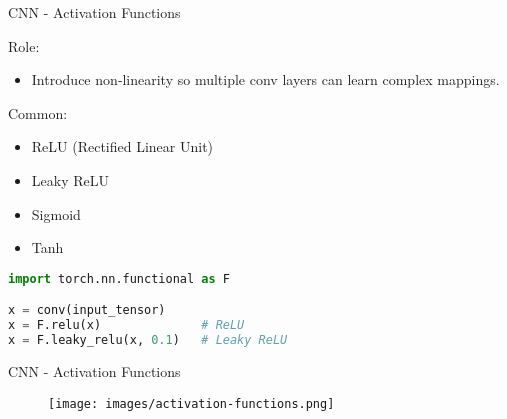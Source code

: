 \begin{frame}[fragile]{CNN - Activation Functions}
\begin{block}{Role:}
    \begin{itemize}
        \item Introduce non‑linearity so multiple conv layers can learn complex mappings.
    \end{itemize}
\end{block}

\begin{block}{Common:}
    \begin{itemize}
        \item ReLU (Rectified Linear Unit)
        \item Leaky ReLU
        \item Sigmoid
        \item Tanh
    \end{itemize}
\end{block}

\begin{lstlisting}[language=Python, caption={Code snippet (PyTorch)}]
import torch.nn.functional as F

x = conv(input_tensor)
x = F.relu(x)              # ReLU
x = F.leaky_relu(x, 0.1)   # Leaky ReLU
\end{lstlisting}
\end{frame}  

\begin{frame}{CNN - Activation Functions}
    \begin{figure}
    \centering
    \texttt{[image: images/activation-functions.png]}
    \end{figure}
\end{frame}